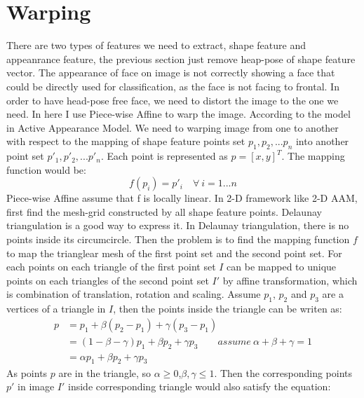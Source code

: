 \section{Warping}
There are two types of features we need to extract, shape feature and appeanrance feature, the previous section just remove heap-pose of shape feature vector. The appearance of face on image is not correctly showing a face that could be directly used for classification, as the face is not facing to frontal. In order to have head-pose free face, we need to distort the image to the one we need. In here I use Piece-wise Affine\cite{AAMWarp} to warp the image. According to the model in Active Appearance Model. We need to warping image from one to another with respect to the mapping of shape feature points set ${p_{1},p_{2},...p_{n}}$ into another point set ${p'_{1},p'_{2},...p'_{n}}$. Each point is represented as $p = [x,y]^{T}$. The mapping function would be:
\begin{equation}
f(p_{i}) = p'_{i} \quad \forall \ i = 1...n
\label{eq:W1}
\end{equation}
\newline
Piece-wise Affine assume that f is locally linear. In 2-D framework like 2-D AAM, first find the mesh-grid constructed by all shape feature points. Delaunay triangulation is a good way to express it. In Delaunay triangulation, there is no points inside its circumcircle. Then the problem is to find the mapping function $f$ to map the trianglear mesh of the first point set and the second point set. For each points on each triangle of the first point set $I$ can be mapped to unique points on each triangles of the second point set $I'$ by affine transformation, which is combination of translation, rotation and scaling. Assume $p_{1}$, $p_{2}$ and $p_{3}$ are a vertices of a triangle in $I$, then the points inside the triangle can be writen as:
\begin{equation}
\begin{split}
p 
& = p_{1} + \beta (p_{2}-p_{1})+\gamma (p_{3}-p_{1}) \\
& = (1-\beta-\gamma)p_{1} + \beta p_{2} + \gamma p_{3} \quad \quad assume \: \alpha + \beta + \gamma = 1\\
&  = \alpha p_{1} + \beta p_{2} + \gamma p_{3}
\end{split}
\end{equation}
\newline
As points $p$ are in the triangle, so $\alpha\geq 0$,$\beta,\gamma \leq 1$. Then the corresponding points $p'$ in image $I'$ inside corresponding triangle would also satisfy the equation:
